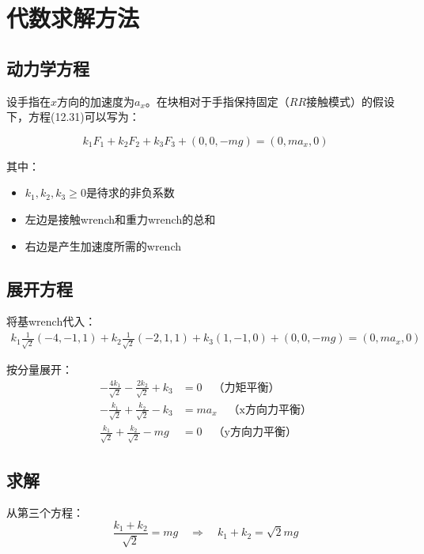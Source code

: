 \documentclass[12pt,a4paper]{article}
\begin{document}
\section{代数求解方法}

\subsection{动力学方程}

设手指在$\hat{x}$方向的加速度为$a_x$。在块相对于手指保持固定（$RR$接触模式）的假设下，方程(12.31)可以写为：

\begin{equation}
k_1 F_1 + k_2 F_2 + k_3 F_3 + (0, 0, -mg) = (0, ma_x, 0)
\label{eq:12.33}
\end{equation}

其中：
\begin{itemize}
    \item $k_1, k_2, k_3 \geq 0$是待求的非负系数
    \item 左边是接触wrench和重力wrench的总和
    \item 右边是产生加速度所需的wrench
\end{itemize}

\subsection{展开方程}

将基wrench代入：
\begin{align}
k_1 \frac{1}{\sqrt{2}}(-4, -1, 1) + k_2 \frac{1}{\sqrt{2}}(-2, 1, 1) + k_3 (1, -1, 0) + (0, 0, -mg) = (0, ma_x, 0)
\end{align}

按分量展开：
\begin{align}
-\frac{4k_1}{\sqrt{2}} - \frac{2k_2}{\sqrt{2}} + k_3 &= 0 \quad \text{（力矩平衡）} \\
-\frac{k_1}{\sqrt{2}} + \frac{k_2}{\sqrt{2}} - k_3 &= ma_x \quad \text{（x方向力平衡）} \\
\frac{k_1}{\sqrt{2}} + \frac{k_2}{\sqrt{2}} - mg &= 0 \quad \text{（y方向力平衡）}
\end{align}

\subsection{求解}

从第三个方程：
\begin{equation}
\frac{k_1 + k_2}{\sqrt{2}} = mg \quad \Rightarrow \quad k_1 + k_2 = \sqrt{2}mg
\end{equation}
\end{document}
